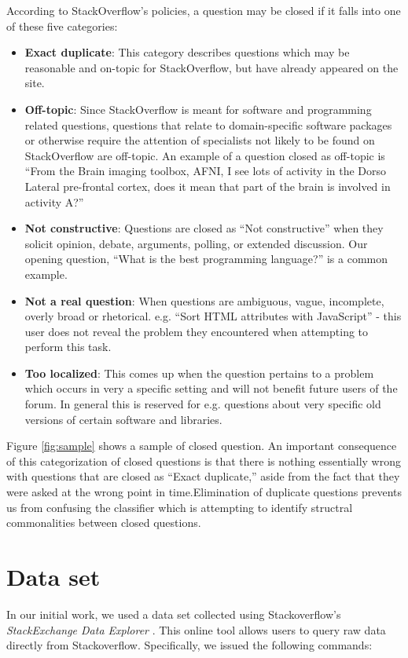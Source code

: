 \documentclass[11pt]{article}
\begin{document}
\noindent According to StackOverflow's policies, a question may be
closed if it falls into one of these five categories:

\begin{itemize}
\item \textbf{Exact duplicate}: This category describes questions which may be reasonable and on-topic for StackOverflow, but have already appeared on the site.
\item \textbf{Off-topic}: Since StackOverflow is meant for software and programming related questions, questions that relate to domain-specific software packages or otherwise require the attention of specialists not likely to be found on StackOverflow are off-topic. An example of a question closed as off-topic is ``From the Brain imaging toolbox, AFNI, I see lots of activity in the Dorso Lateral pre-frontal cortex, does it mean that part of the brain is involved in activity A?''
\item \textbf{Not constructive}: Questions are closed as ``Not constructive'' when they solicit opinion, debate, arguments, polling, or extended discussion. Our opening question, ``What is the best programming language?'' is a common example.
\item \textbf{Not a real question}: When questions are ambiguous, vague, incomplete, overly broad or rhetorical. e.g. ``Sort HTML attributes with JavaScript'' - this user does not reveal the problem they encountered when attempting to perform this task.
\item \textbf{Too localized}: This comes up when the question pertains to a problem which occurs in very a specific setting and will not benefit future users of the forum. In general this is reserved for e.g. questions about very specific old versions of certain software and libraries. 
\end{itemize}

\noindent Figure \ref{fig:sample} shows a sample of closed question. An important consequence of this categorization of closed questions is that there is nothing essentially wrong with questions that are closed as ``Exact duplicate,'' aside from the fact that they were asked at the wrong point in time.Elimination of duplicate questions prevents us from confusing the classifier which is attempting to identify structral commonalities between closed questions.

\section{Data set}
In our initial work, we used a data set collected using
Stackoverflow's \emph{StackExchange Data Explorer}
\cite{website:stackexchange}. This online tool
allows users to query raw data directly from
Stackoverflow. Specifically, we issued the following commands:
\end{document}
